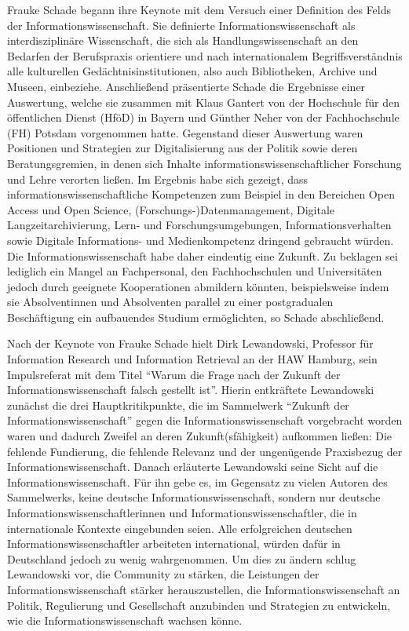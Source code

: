 \documentclass[a4paper,
fontsize=11pt,
oneside,
numbers=noperiodatend,
parskip=half-,
bibliography=totoc,
final
]{scrartcl}
\begin{document}
Frauke Schade begann ihre Keynote mit dem Versuch einer Definition des
Felds der Informationswissenschaft. Sie definierte
Informationswissenschaft als interdisziplinäre Wissenschaft, die sich
als Handlungswissenschaft an den Bedarfen der Berufspraxis orientiere
und nach internationalem Begriffsverständnis alle kulturellen
Gedächtnisinstitutionen, also auch Bibliotheken, Archive und Museen,
einbeziehe. Anschließend präsentierte Schade die Ergebnisse einer
Auswertung, welche sie zusammen mit Klaus Gantert von der Hochschule für
den öffentlichen Dienst (HföD) in Bayern und Günther Neher von der
Fachhochschule (FH) Potsdam vorgenommen hatte. Gegenstand dieser
Auswertung waren Positionen und Strategien zur Digitalisierung aus der
Politik sowie deren Beratungsgremien, in denen sich Inhalte
informationswissenschaftlicher Forschung und Lehre verorten ließen. Im
Ergebnis habe sich gezeigt, dass informationswissenschaftliche
Kompetenzen zum Beispiel in den Bereichen Open Access und Open Science,
(Forschungs-)Datenmanagement, Digitale Langzeitarchivierung, Lern- und
Forschungsumgebungen, Informationsverhalten sowie Digitale Informations-
und Medienkompetenz dringend gebraucht würden. Die
Informationswissenschaft habe daher eindeutig eine Zukunft. Zu beklagen
sei lediglich ein Mangel an Fachpersonal, den Fachhochschulen und
Universitäten jedoch durch geeignete Kooperationen abmildern könnten,
beispielsweise indem sie Absolventinnen und Absolventen parallel zu
einer postgradualen Beschäftigung ein aufbauendes Studium ermöglichten,
so Schade abschließend.

Nach der Keynote von Frauke Schade hielt Dirk Lewandowski, Professor für
Information Research und Information Retrieval an der HAW Hamburg, sein
Impulsreferat mit dem Titel \enquote{Warum die Frage nach der Zukunft
der Informationswissenschaft falsch gestellt ist}. Hierin entkräftete
Lewandowski zunächst die drei Hauptkritikpunkte, die im Sammelwerk
\enquote{Zukunft der Informationswissenschaft} gegen die
Informationswissenschaft vorgebracht worden waren und dadurch Zweifel an
deren Zukunft(sfähigkeit) aufkommen ließen: Die fehlende Fundierung, die
fehlende Relevanz und der ungenügende Praxisbezug der
Informationswissenschaft. Danach erläuterte Lewandowski seine Sicht auf
die Informationswissenschaft. Für ihn gebe es, im Gegensatz zu vielen
Autoren des Sammelwerks, keine deutsche Informationswissenschaft,
sondern nur deutsche Informationswissenschaftlerinnen und
Informationswissenschaftler, die in internationale Kontexte eingebunden
seien. Alle erfolgreichen deutschen Informationswissenschaftler
arbeiteten international, würden dafür in Deutschland jedoch zu wenig
wahrgenommen. Um dies zu ändern schlug Lewandowski vor, die Community zu
stärken, die Leistungen der Informationswissenschaft stärker
herauszustellen, die Informationswissenschaft an Politik, Regulierung
und Gesellschaft anzubinden und Strategien zu entwickeln, wie die
Informationswissenschaft wachsen könne.
\end{document}
